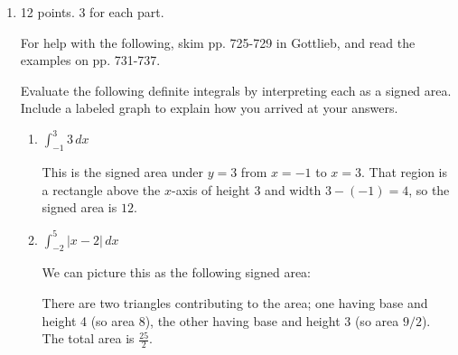\documentclass{article}
\begin{document}
\begin{enumerate}
 

\item 

\begin{grading}
12 points. 3 for each part.
\end{grading}

 For help with the following, skim pp. 725-729 in Gottlieb, and read the examples on pp. 731-737.
 
Evaluate the following definite integrals by interpreting each as a
  signed area. Include a labeled graph to explain how you arrived at your answers.

  \probonly{}
    \begin{enumerate}
    \item
      \begin{problem}[\vfill]
        $\displaystyle \int_{-1}^{3}3\, dx$
      \end{problem}

      \begin{solution} %
        This is the signed area under $y = 3$ from $x = -1$ to $x = 3$.
        That region is a rectangle above the $x$-axis of height 3 and
        width $3 - (-1) = 4$, so the signed area is $\boxed{12}$.
      \end{solution}

    \item
      \begin{problem}[\vfill]
        $\displaystyle\int_{-2}^5 | x-2 | \, dx$
      \end{problem}

      \begin{solution} %
        We can picture this as the following signed area:
        \begin{center}
        \end{center}        
        There are two triangles contributing to the area; one having base
        and height 4 (so area 8), the other having base and height 3 (so
        area $9/2$). The total area is $\boxed{\frac{25}{2}}$.
      \end{solution}


\end{enumerate}
\end{enumerate}
\end{document}
